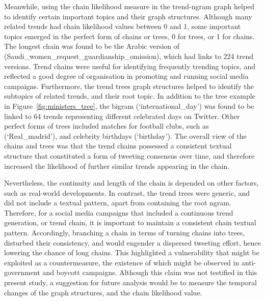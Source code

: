 \documentclass[conference]{IEEEtran}
\begin{document}
{Meanwhile, using the chain likelihood measure in the trend-ngram graph helped 
to identify certain important topics and their graph structures. Although many 
related trends had chain likelihood values between 0 and 1, some important topics 
emerged in the perfect form of chains or trees, 0 for trees, or 1 for chains. 
The longest chain was found to be the Arabic version of
(Saudi\_women\_request\_guardianship\_omission), which had links to 224 trend 
versions. Trend chains were useful for identifying frequently trending topics, 
and reflected a good degree of organisation in promoting and running social 
media campaigns. Furthermore, the trend trees graph structures helped to identify 
the subtopics of related trends, and their root topic. In addition to the tree example 
in Figure~\ref{fig:ministers_tree}, the bigram (‘international\_day’) 
was found to be linked to 64 trends representing different celebrated days on Twitter. Other perfect forms 
of trees included matches for football clubs, such as (‘Real\_madrid’), and 
celebrity birthdays (‘birthday’). 
The overall view of the chains and trees was that the trend chains possessed a 
consistent textual structure that constituted a form of tweeting consensus over time, 
and therefore increased the likelihood of further similar trends appearing in the chain. 


Nevertheless, the continuity and length of the chain is depended on other factors, such 
as real-world developments. In contrast, the trend trees were generic, and did not 
include a textual pattern, apart from containing the root ngram. 
Therefore, for a social media campaigns that included a continuous trend generation,
or trend chain, it is important to maintain a consistent chain textual pattern. Accordingly,
branching a chain in terms of turning chains into trees, disturbed their consistency, and 
would engender a dispersed tweeting effort, hence lowering the chance of long chains. 
This highlighted a vulnerability that might be exploited as a countermeasure, the existence 
of which might be observed in anti-government and boycott campaigns. Although this 
claim was not testified in this present study, a suggestion for future analysis would be to 
measure the temporal changes of the graph structures, and the chain likelihood value.  


}
\end{document}
